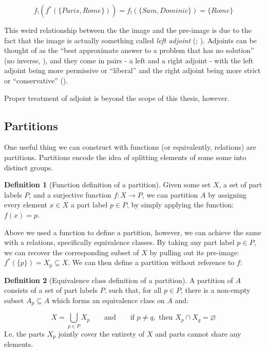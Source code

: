 \documentclass[
]{book}
\theoremstyle{definition}
\newtheorem{definition}{Definition}[chapter]
\theoremstyle{definition}
\theoremstyle{definition}
\theoremstyle{definition}
\theoremstyle{remark}
\begin{document}
\[f_!(f^*(\{Paris, Rome \})) = f_!(\{ Sam, Dominic \}) = \{ Rome \}\]

This weird relationship between the the image and the pre-image is due to the fact that the image is actually something called \emph{left adjoint} (; ). Adjoints can be thought of as the ``best approximate answer to a problem that has no solution'' (no inverse, ), and they come in pairs - a left and a right adjoint - with the left adjoint being more permissive or ``liberal'' and the right adjoint being more strict or ``conservative'' ().

Proper treatment of adjoint is beyond the scope of this thesis, however.

\subsection{Partitions}\label{partitions}

One useful thing we can construct with functions (or equivalently, relations) are partitions. Partitions encode the idea of splitting elements of some some into distinct groups.

\begin{definition}[Function definition of a partition]
Given some set \(X\), a set of part labels \(P\), and a surjective function \(f: X \to P\), we can partition \(A\) by assigning every element \(x \in X\) a part label \(p \in P\), by simply applying the function: \(f(x) = p\).
\end{definition}

Above we used a function to define a partition, however, we can achieve the same with a relations, specifically equivalence classes. By taking any part label \(p \in P\), we can recover the corresponding subset of \(X\) by pulling out its pre-image: \(f^*(\{p\}) = X_p \subseteq X\). We can then define a partition without reference to \(f\):

\begin{definition}[Equivalence class definition of a partition]
A partition of \(A\) consists of a set of part labels \(P\), such that, for all \(p \in P\), there is a non-empty subset \(A_p \subseteq A\) which forms an equivalence class on \(A\) and:

\[X = \bigcup_{p \in P} X_p \qquad \text{and} \qquad \text{if } p \neq q, \text{ then } X_p \cap X_q = \varnothing\]
I.e. the parts \(X_p\) jointly cover the entirety of \(X\) and parts cannot share any elements.
\end{definition}
\end{document}
